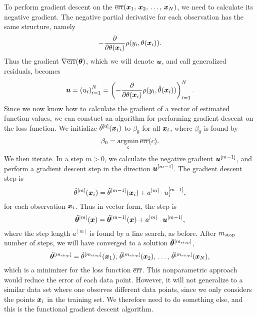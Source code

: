 To perform gradient descent on the $\overline{\text{err}}(\bm{x}_1,\,\bm{x}_2,\,\ldots,\,\bm{x}_N)$, we need to calculate its negative gradient.
The negative partial derivative for each observation has the same structure, namely
\begin{equation*}
    -\frac{\partial}{\partial\theta(\bm{x}_i)} \rho(y_i,\theta(\bm{x}_i)).
\end{equation*}
Thus the gradient $\nabla \overline{\text{err}}(\boldsymbol{\theta})$, which we will denote $\bm{u}$, and call generalized residuals, becomes
\begin{equation*}
    \bm{u}=\left(u_i\right)_{i=1}^N=\left(-\frac{\partial}{\partial \theta(\bm{x}_i)}\rho(y_i, \hat{\theta}(\bm{x}_i))\right)_{i=1}^N.
\end{equation*}
Since we now know how to calculate the gradient of a vector of estimated function values, we can constuct an algorithm for performing gradient descent on the loss function.
We initialize $\hat{\theta}^{[0]}(\bm{x}_i)$ to $\beta_0$ for all $\bm{x}_i$, where $\beta_0$ is found by
\begin{equation*}
    \beta_0=\operatorname*{argmin}_{c}\overline{\text{err}}(c).
\end{equation*}
We then iterate.
In a step $m>0$, we calculate the negative gradient $\bm{u}^{[m-1]}$, and perform a gradient descent step in the direction $\bm{u}^{[m-1]}$.
The gradient descent step is
\begin{equation*}
    \hat{\theta}^{[m]}(\bm{x}_i)=\hat{\theta}^{[m-1]}(\bm{x}_i)+a^{[m]}\cdot u_i^{[m-1]},
\end{equation*}
for each observation $\bm{x}_i$.
Thus in vector form, the step is
\begin{equation*}
    \hat{\boldsymbol{\theta}}^{[m]}(\bm{x})=\hat{\boldsymbol{\theta}}^{[m-1]}(\bm{x})+a^{[m]}\cdot \bm{u}^{[m-1]},
\end{equation*}
where the step length $a^{[m]}$ is found by a line search, as before.
After $m_{\text{stop}}$ number of steps, we will have converged to a solution $\hat{\boldsymbol{\theta}}^{[m_{\text{stop}}]}$,
\begin{equation*}
    \hat{\boldsymbol{\theta}}^{[m_{\text{stop}}]}=\hat{\theta}^{[m_{\text{stop}}]}(\bm{x}_1),\,\hat{\theta}^{[m_{\text{stop}}]}(\bm{x}_2),\,\ldots,\,\hat{\theta}^{[m_{\text{stop}}]}(\bm{x}_N),
\end{equation*}
which is a minimizer for the loss function $\overline{\text{err}}$.
This nonparametric approach would reduce the error of each data point.
However, it will not generalize to a similar data set where one observes different data points, since we only considers the points $\bm{x}_i$ in the training set.
We therefore need to do something else, and this is the functional gradient descent algorithm.


